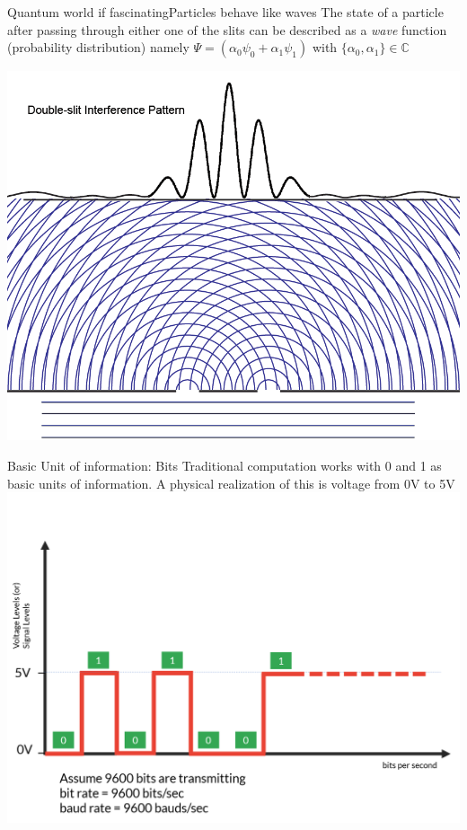 \documentclass{beamer}
\begin{document}
\begin{frame}{Quantum world if fascinating}{Particles behave like waves}
    \justifying
    The state of a particle after passing through either one of the slits can be described as a \textit{wave} function (probability distribution) namely $\Psi = (\alpha_0 \psi_0 + \alpha_1 \psi_1)$ with $\{\alpha_0,\alpha_1\} \in \mathbb{C}$

    \center
	\includegraphics[keepaspectratio=true,width=.5\paperwidth]{.attachments/double-slit-distro.png}
\end{frame}


\begin{frame}{Basic Unit of information: Bits}
	\justifying
	Traditional computation works with 0 and 1 as basic units of information. A physical realization of this is voltage from 0V to 5V
	\center
	\includegraphics[keepaspectratio=true,width=.6\paperwidth]{.attachments/Bitrateequalbaudrate.png}
\end{frame}
\end{document}

